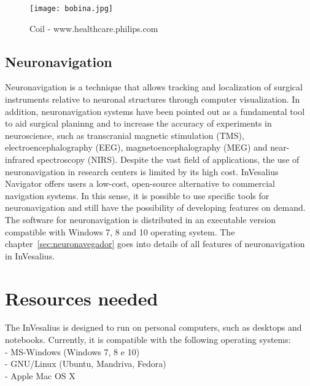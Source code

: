 \begin{figure}[!htb]
\centering
\texttt{[image: bobina.jpg]}
\caption{Coil - www.healthcare.philips.com}
\end{figure}

\subsection{Neuronavigation}
\label{sec:neuronavegador_intro}

Neuronavigation is a technique that allows tracking and localization of surgical instruments relative to neuronal
structures through computer visualization. In addition, neuronavigation systems have been pointed out as a fundamental
tool to aid surgical planinng and to increase the accuracy of experiments in neuroscience, such as transcranial magnetic
stimulation (TMS), electroencephalography (EEG), magnetoencephalography (MEG) and near-infrared spectroscopy (NIRS).
Despite the vast field of applications, the use of neuronavigation in research centers is limited by its high cost.
InVesalius Navigator offers users a low-cost, open-source alternative to commercial navigation systems. In this sense,
it is possible to use specific tools for neuronavigation and still have the possibility of developing features on demand.
The software for neuronavigation is distributed in an executable version compatible with Windows 7, 8 and 10 operating
system. The chapter~\ref{sec:neuronavegador} goes into details of all features of neuronavigation in InVesalius.


\section{Resources needed}

The InVesalius is designed to run on personal computers, such as desktops and notebooks. Currently, it is compatible with the following operating systems:\\
- MS-Windows (Windows 7, 8 e 10)\\
- GNU/Linux (Ubuntu, Mandriva, Fedora)\\
- Apple Mac OS X

